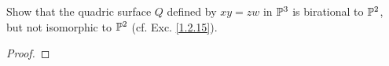 \label{1.4.5}

Show that the quadric surface $Q$ defined by $xy = zw$ in $\P^3$ is birational to $\P^2$, but not isomorphic to $\P^2$ (cf. Exc. \ref{1.2.15}).

\begin{proof}

\end{proof}
